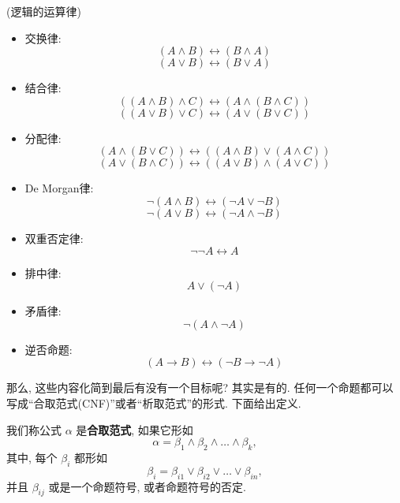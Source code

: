       \begin{proposition}(逻辑的运算律)
        \begin{itemize}
            
            \item 交换律:
          \[
            (A \land B) \leftrightarrow (B \land A)
          \]
          \[
            (A \lor B) \leftrightarrow (B \lor A)
          \]
        \item 结合律:
          \[
            ((A \land B) \land C) \leftrightarrow (A \land (B \land C))
          \]
          \[
            ((A \lor B) \lor C) \leftrightarrow (A \lor (B \lor C))
          \]
        \item 分配律:
          \[
            (A \land (B \lor C)) \leftrightarrow ((A \land B) \lor (A \land C))
          \]
          \[
            (A \lor (B \land C)) \leftrightarrow ((A \lor B) \land (A \lor C))
          \]
        \item De Morgan律: 
          \[
            \lnot (A \land B) \leftrightarrow (\lnot A \lor \lnot B)
          \]
          \[
            \lnot (A \lor B) \leftrightarrow (\lnot A \land \lnot B)
          \]
          \item 双重否定律:
            \[
                \lnot \lnot A \leftrightarrow A
            \]
            \item 排中律:
            \[
                A \lor (\lnot A)
            \]
            \item 矛盾律:
            \[
                \lnot (A \land \lnot A)
            \]
            \item 逆否命题:
            \[
                (A \to B) \leftrightarrow (\lnot B \to \lnot A)
            \]
        \end{itemize}
        
      \end{proposition}

      那么, 这些内容化简到最后有没有一个目标呢? 其实是有的. 任何一个命题都可以写成``合取范式(CNF)''或者``析取范式''的形式. 下面给出定义. 
      
      \begin{definition}
            我们称公式 $\alpha$ 是{\bf 合取范式}, 如果它形如
            \[
              \alpha = \beta_{1} \land \beta_{2} \land \dots \land \beta_{k},
            \]
            其中, 每个 $\beta_{i}$ 都形如
            \[
              \beta_{i} = \beta_{i1} \lor \beta_{i2} \lor \dots \lor \beta_{in},
            \]
            并且 $\beta_{ij}$ 或是一个命题符号, 或者命题符号的否定. 
    \end{definition}


